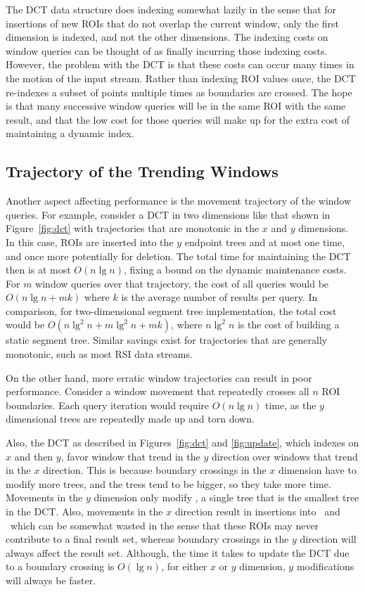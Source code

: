 \documentclass{ucdthesis}       %
\begin{document}
The \ac{DCT} data structure does indexing somewhat lazily in the sense
that for insertions of new \acp{ROI} that do not overlap the
current window, only the first dimension is indexed, and not the
other dimensions.  The indexing costs on window queries can be thought
of as finally incurring those indexing costs.  However, the problem
with the \ac{DCT} is that these costs can occur many times in the motion
of the input stream.  Rather than indexing \ac{ROI} values once, the
\ac{DCT} re-indexes a subset of points multiple times as boundaries are
crossed.  The hope is that many successive window queries will be in
the same \ac{ROI} with the same result, and that the low cost for those
queries will make up for the extra cost of maintaining a dynamic
index.

\subsection{Trajectory of the Trending Windows}

Another aspect affecting performance is the movement trajectory of the
window queries.  For example, consider a \ac{DCT} in two dimensions like
that shown in Figure~\ref{fig:dct} with trajectories that are
monotonic in the $x$ and $y$ dimensions.  In this case, \acp{ROI} are
inserted into the $y$ endpoint trees and  at most one time, and
once more potentially for deletion.  The total time for maintaining
the \ac{DCT} then is at most $O(n\lg{n})$, fixing a bound on the dynamic
maintenance costs.  For $m$ window queries over that trajectory, the
cost of all queries would be $O(n\lg{n}+mk)$ where $k$ is the average
number of results per query.  In comparison, for two-dimensional
segment tree implementation, the total cost would be
$O(n\lg^2{n}+m\lg^2{n}+mk)$, where $n\lg^2{n}$ is the cost of building
a static segment tree.  Similar savings exist for trajectories that
are generally monotonic, such as most \ac{RSI} data streams.

On the other hand, more erratic window trajectories can result in poor
performance.  Consider a window movement that repeatedly crosses all
$n$ \ac{ROI} boundaries.  Each query iteration would require
$O(n\lg{n})$ time, as the $y$ dimensional trees are repeatedly made up
and torn down.

Also, the \ac{DCT} as described in Figures~\ref{fig:dct} and
\ref{fig:update}, which indexes on $x$ and then $y$, favor window that
trend in the $y$ direction over windows that trend in the $x$
direction.  This is because boundary crossings in the $x$ dimension
have to modify more trees, and the tress tend to be bigger, so they
take more time.  Movements in the $y$ dimension only modify , a
single tree that is the smallest tree in the \ac{DCT}.  Also,
movements in the $x$ direction result in insertions into \Yn\ and \Yx\
which can be somewhat wasted in the sense that these \acp{ROI} may
never contribute to a final result set, whereas boundary crossings in
the $y$ direction will always affect the result set.  Although, the
time it takes to update the \ac{DCT} due to a boundary crossing is
$O(\lg{n})$, for either $x$ or $y$ dimension, $y$ modifications will
always be faster.
\end{document}
